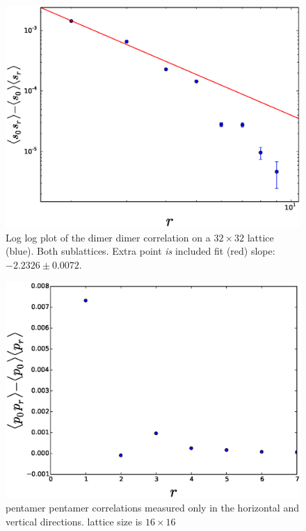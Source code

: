\documentclass[aps,floatfix,11pt]{revtex4-1}
\begin{document}
\begin{figure}[h]
    \centering
    \includegraphics[width=8.5 cm]{s_dimer_dimer_cor_loglog_both_sublat_32x32_extra_pnt}
    \caption{Log log plot of the dimer dimer correlation on a $32\times32$ lattice (blue). 
        Both sublattices. Extra point \textit{is} included fit (red) slope: $-2.2326 \pm 0.0072$.
    \label{fig:s_dimer_dimer_cor_loglog_both_sublat_32x32_extra_pnt}}
\end{figure}

\begin{figure}[h]
    \centering
    \includegraphics[width=8.5 cm]{star_star_horz_vert_cor_both_sublat_16x16}
    \caption{pentamer pentamer correlations measured only in the horizontal and vertical directions.
    lattice size is $16\times 16$}
    \label{fig:star_star_cor_both_sublat_16x16}
\end{figure}
\end{document}
